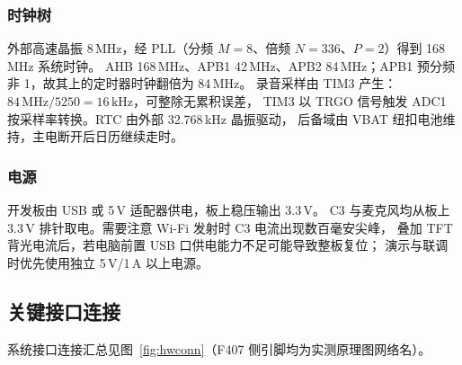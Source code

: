 \subsubsection{时钟树}
外部高速晶振 8\,MHz，经 PLL（分频 $M=8$、倍频 $N=336$、$P=2$）得到 168\,MHz 系统时钟。
AHB 168\,MHz、APB1 42\,MHz、APB2 84\,MHz；APB1 预分频非 1，故其上的定时器时钟翻倍为 84\,MHz。
录音采样由 TIM3 产生：$84\,\text{MHz}/5250=16\,\text{kHz}$，可整除无累积误差，
TIM3 以 TRGO 信号触发 ADC1 按采样率转换。RTC 由外部 32.768\,kHz 晶振驱动，
后备域由 VBAT 纽扣电池维持，主电断开后日历继续走时。

\subsubsection{电源}
开发板由 USB 或 5\,V 适配器供电，板上稳压输出 3.3\,V。
C3 与麦克风均从板上 3.3\,V 排针取电。需要注意 Wi-Fi 发射时 C3 电流出现数百毫安尖峰，
叠加 TFT 背光电流后，若电脑前置 USB 口供电能力不足可能导致整板复位；
演示与联调时优先使用独立 5\,V/1\,A 以上电源。

\subsection{关键接口连接}
系统接口连接汇总见图~\ref{fig:hwconn}（F407 侧引脚均为实测原理图网络名）。

